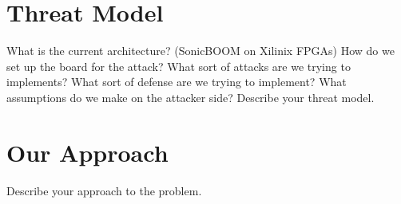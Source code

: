 \section{Threat Model}
\label{sec:threat}

What is the current architecture? (SonicBOOM on Xilinix FPGAs)  How do we set up the board for the attack? What sort of attacks are we trying to implements? What sort of defense are we trying to implement? What assumptions do we make on the attacker side?  
Describe your threat model.

\section{Our Approach}
\label{sec:approach}

Describe your approach to the problem.


